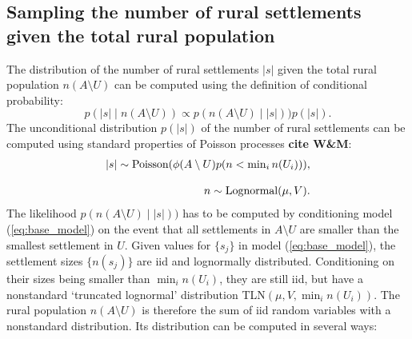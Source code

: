\documentclass[a4paper]{article}
\begin{document}
\subsection{Sampling the number of rural settlements given the total rural population}
The distribution of the number of rural settlements $|s|$ given the total rural population $n(A\setminus U)$ can be computed using the definition of conditional probability:
\begin{equation}
	p(|s|\mid n(A\setminus U)) \propto p(n(A\setminus U)\mid|s|))p(|s|).
\end{equation}
The unconditional distribution $p(|s|)$ of the number of rural settlements can be computed using standard properties of Poisson processes \textbf{cite W\&M}:
\begin{equation}
	\begin{array}{r}
		|s|\sim \textup{Poisson}(\phi(A\setminus U)p(n<\min_i n(U_i))),\\\\
		n\sim \textup{Lognormal}(\mu, V).
	\end{array}
\end{equation}
The likelihood $p(n(A\setminus U)\mid|s|))$ has to be computed by conditioning model (\ref{eq:base_model}) on the event that all settlements in $A\setminus U$ are smaller than the smallest settlement in $U$. Given values for $\{s_j\}$ in model (\ref{eq:base_model}), the settlement sizes $\{n(s_j)\}$ are iid and lognormally distributed. Conditioning on their sizes being smaller than $\min_i n(U_i)$, they are still iid, but have a nonstandard `truncated lognormal' distribution TLN$(\mu,V,\min_i n(U_i))$. The rural population $n(A\setminus U)$ is therefore the sum of iid random variables with a nonstandard distribution. Its distribution can be computed in several ways:
\end{document}
